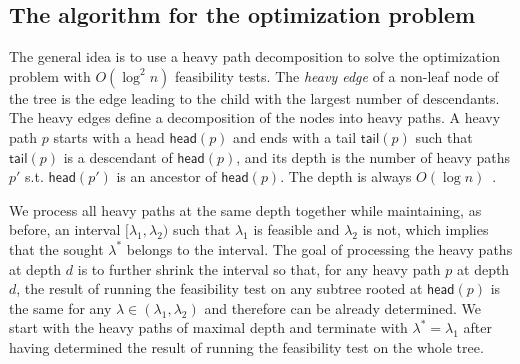 \documentclass[11pt,a4paper]{article}
\newcommand{\head}{\textsf{head}}
\newcommand{\tail}{\textsf{tail}}
\theoremstyle{definition}
\theoremstyle{remark}
\begin{document}
\subsection{The algorithm for the optimization problem} \label{sec:nloglogn}

The general idea is to use a heavy path decomposition to solve the optimization  problem
with $O(\log^{2}n)$ feasibility tests. The {\em heavy edge} of a non-leaf node of the tree is the edge leading to the child
with the largest number of descendants. The heavy edges define a decomposition of the nodes into heavy paths. A heavy
path $p$ starts with a head $\head(p)$ and ends with a tail $\tail(p)$ such that $\tail(p)$ is a descendant of $\head(p)$,
and its depth is the number of heavy paths $p'$ s.t. $\head(p')$ is an ancestor of $\head(p)$. The depth 
is always $O(\log n)$~\cite{Sleator1983}.

We process all heavy paths at the same depth together while maintaining, as before, an interval $[\lambda_{1},\lambda_{2})$ such that
$\lambda_{1}$ is feasible and $\lambda_{2}$ is not, which implies that the sought $\lambda^{*}$ belongs to the interval.
The goal of processing the heavy paths at depth $d$ is to further shrink the interval so that, for any heavy path $p$ at depth $d$,
the result of running the feasibility
test on any subtree rooted at $\head(p)$ is the same for any $\lambda\in(\lambda_{1},\lambda_{2})$ and therefore can
be already determined. We start with the heavy paths of maximal depth and terminate
with $\lambda^{*}=\lambda_{1}$ after having determined the result of running the feasibility test on the whole tree.
\end{document}
